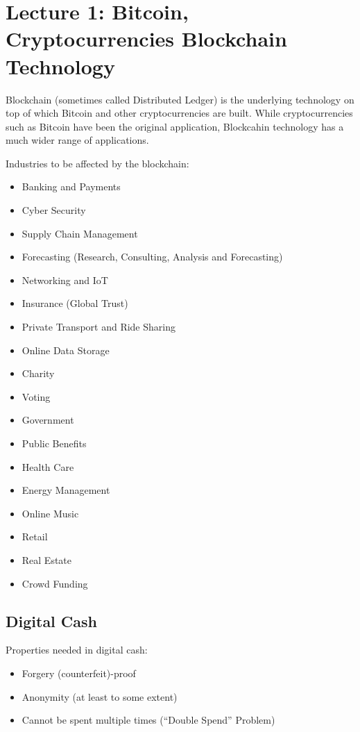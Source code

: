 \section{Lecture 1: Bitcoin, Cryptocurrencies Blockchain Technology}
\begin{leftbar}
	Blockchain (sometimes called Distributed Ledger) is the underlying technology on top of which Bitcoin and other cryptocurrencies are built. While cryptocurrencies such as Bitcoin have been the original application, Blockcahin technology has a much wider range of applications.
\end{leftbar}
Industries to be affected by the blockchain:
\begin{itemize}
	\item Banking and Payments
	\item Cyber Security
	\item Supply Chain Management
	\item Forecasting (Research, Consulting, Analysis and Forecasting)
	\item Networking and IoT
	\item Insurance (Global Trust)
	\item Private Transport and Ride Sharing
	\item Online Data Storage
	\item Charity
	\item Voting
	\item Government
	\item Public Benefits
	\item Health Care
	\item Energy Management
	\item Online Music
	\item Retail
	\item Real Estate
	\item Crowd Funding
\end{itemize}

\subsection{Digital Cash}
Properties needed in digital cash:
\begin{itemize}
	\item Forgery (counterfeit)-proof
	\item Anonymity (at least to some extent)
	\item Cannot be spent multiple times (``Double Spend'' Problem)
\end{itemize}
